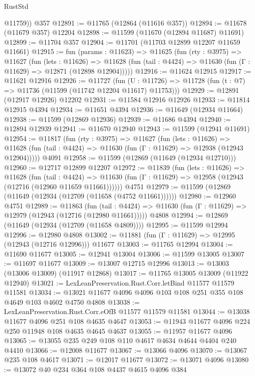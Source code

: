 \begin{lexlean}{RustStd}
\begin{coremodule}
        @11759))
    @357
@12891 := @11765 (@12864 (@11616 @357))
@12894 := @11678 (@11679 @357) @12204
@12898 := @11599 (@11670 (@12894 @11687) @11691)
@12899 := @11704 @357
@12904 := @11701 (@11703 @12899 @12207 @11659 @11661)
@12915 := fun (params : @11623) =>
  @11625
    (fun (rty : @3975) =>
    @11627
      (fun (lets : @11626) =>
      @11628 (fun (tail : @4424) => @11630 (fun (Γ : @11629) => @12871 (@12898 @12904)))))
@12916 := @11624 @12915
@12917 := @11621 @12916
@12926 := @11727
    (fun (U : @11726) => @11728 (fun (t : @7) => @11736 (@11599 (@11742 @12204 @11617) @11753)))
@12929 := @12891 (@12917 @12926) @12202
@12931 := @11584 @12916 @12926
@12933 := @11814 @12915 @4394
@12934 := @11651 @4394
@12936 := @11649 (@12934 @11664)
@12938 := @11599 (@12869 @12936)
@12939 := @11686 @4394
@12940 := @12894 @12939
@12941 := @11670 @12940
@12943 := @11599 (@12941 @11691)
@12954 := @11817
    (fun (rty : @3975) =>
    @11627
      (fun (lets : @11626) =>
      @11628 (fun (tail : @4424) => @11630 (fun (Γ : @11629) => @12938 (@12943 @12904)))))
    @4091
@12958 := @11599 (@12869 (@11649 (@12934 @12710)))
@12960 := @12717 @12899 @12207
@12972 := @11839
    (fun (lets : @11626) =>
    @11628
      (fun (tail : @4424) =>
      @11630 (fun (Γ : @11629) => @12958 (@12943 (@12716 (@12960 @11659 @11661))))))
    @4751
@12979 := @11599 (@12869 (@11649 (@12934 (@12709 (@11658 (@4752 @11661))))))
@12980 := @12960 @4751
@12989 := @11863
    (fun (tail : @4424) => @11630 (fun (Γ : @11629) => @12979 (@12943 (@12716 (@12980 @11661)))))
    @4808
@12994 := @12869 (@11649 (@12934 (@12709 (@11658 @4809))))
@12995 := @11599 @12994
@12996 := @12980 @4808
@13002 := @11881 (fun (Γ : @11629) => @12995 (@12943 (@12716 @12996))) @11677
@13003 := @11765 @12994
@13004 := @11690 @11677
@13005 := @12941 @13004
@13006 := @11599 @13005
@13007 := @11697 @11677
@13009 := @13007 @12715 @12996
@13013 := @13003 (@13006 @13009) (@11917 @12868)
@13017 := @11765 @13005 @13009 (@11922 @12940)
@13021 := LexLeanPreservation.Rust.Corr.letBind @11577 @11579 @11581
@13034 := @13021 @11677 @4096 @4096 @103 @108 @251 @355 @108 @4649 @103 @4602 @4750 @4808
@13038 := LexLeanPreservation.Rust.Corr.eOfB @11577 @11579 @11581
@13044 := @13038 @11677 @4096 @251 @108 @4635 @4647
@13053 := @11943 @11677 @4096 @224 @250 @11948 @108 @4635 @4645 @4637
@13055 := @11957 @11677 @4096
@13065 := @13055 @235 @249 @108 @110 @4617 @4634 @4644 @4404 @240 @4410
@13066 := @12008 @11677
@13067 := @13066 @4096
@13070 := @13067 @235 @108 @4617
@13071 := @12017 @11677
@13072 := @13071 @4096
@13080 := @13072 @40 @234 @364 @108 @4437 @4615 @4096 @384

\end{coremodule}
\end{lexlean}

